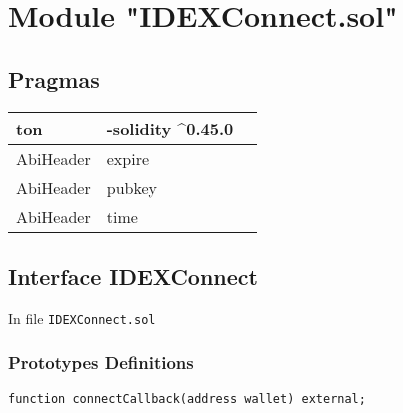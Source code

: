 
\section{Module "IDEXConnect.sol"}


\subsection{Pragmas}


\noindent\begin{tabular}{|l|l|p{5cm}|}\hline
ton & -solidity \^{}0.45.0 &\\\hline
AbiHeader &  expire &\\\hline
AbiHeader &  pubkey &\\\hline
AbiHeader &  time &\\\hline
\end{tabular}


\subsection{Interface IDEXConnect}


In file {\tt IDEXConnect.sol}

\subsubsection{Prototypes Definitions}

\vspace{2cm}

\begin{lstlisting}[firstnumber=7]
  function connectCallback(address wallet) external;
\end{lstlisting}
